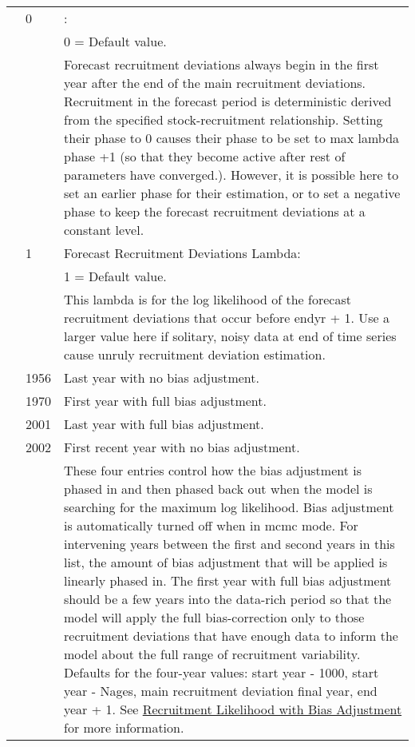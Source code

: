 \begin{longtable}{p{1cm} p{3cm} p{12cm}}
	\Tstrut & 0 & \raisebox{0.1\ht\strutbox}{\hypertarget{FcastRecDevPhase}{Forecast Recruitment Deviations Phase}}: \\
			&   & 0 = Default value. \\
			&   & Forecast recruitment deviations always begin in the first year after the end of the main recruitment deviations. Recruitment in the forecast period is deterministic derived from the specified stock-recruitment relationship. Setting their phase to 0 causes their phase to be set to max lambda phase +1 (so that they become active after rest of parameters have converged.). However, it is possible here to set an earlier phase for their estimation, or to set a negative phase to keep the forecast recruitment deviations at a constant level. \Bstrut\\

	\Tstrut & 1 & Forecast Recruitment Deviations Lambda: \\
			&   & 1 = Default value. \\
			&   & This lambda is for the log likelihood of the forecast recruitment deviations that occur before endyr + 1. Use a larger value here if solitary, noisy data at end of time series cause unruly recruitment deviation estimation. \\
	
	\Tstrut & 1956 & Last year with no bias adjustment. \\
			& 1970 & First year with full bias adjustment. \\
			& 2001 & Last year with full bias adjustment. \\
			& 2002 & First recent year with no bias adjustment. \\
			& 	   & These four entries control how the bias adjustment is phased in and then phased back out when the model is searching for the maximum log likelihood. Bias adjustment is automatically turned off when in \gls{mcmc} mode. For intervening years between the first and second years in this list, the amount of bias adjustment that will be applied is linearly phased in. The first year with full bias adjustment should be a few years into the data-rich period so that the model will apply the full bias-correction only to those recruitment deviations that have enough data to inform the model about the full range of recruitment variability. Defaults for the four-year values: start year - 1000, start year - Nages, main recruitment deviation final year, end year + 1. See \hyperlink{RecBias}{Recruitment Likelihood with Bias Adjustment} for more information. \\
	

\end{longtable}
